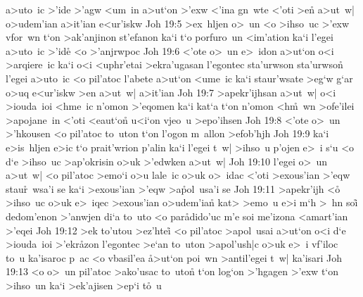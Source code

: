 a>uto~ic
>'ide
>'agw
<um~in
a>ut`on
>'exw
<'ina
gn~wte
<'oti
>en\r{}
a>ut~w|
o>udem'ian
a>it'ian
e<ur'iskw\bibvsend
\vs Joh 19:5
>ex~hljen
o>~un
<o
>ihso~uc
>'exw
vfor~wn
t`on
>ak'anjinon
st'efanon
ka`i
t`o
porfuro~un
<im'ation
ka`i
l'egei
a>uto~ic
>'id\r{e}
<o
>'anjrwpoc\bibvsend
\vs Joh 19:6
<'ote
o>~un
e>~idon
a>ut`on
o<i
>arqiere~ic
ka`i
o<i
<uphr'etai
>ekra'ugasan
l'egontec
sta'urwson
sta'urwso\r{n}
l'egei
a>uto~ic
<o
pil'atoc
l'abete
a>ut`on
<ume~ic
ka`i
staur'wsate
>eg`w
g`ar
o>uq
e<ur'iskw
>en
a>ut~w|
a>it'ian\bibvsend
\vs Joh 19:7
>apekr'ijhsan
a>ut~w|
o<i
>iouda~ioi
<hme~ic
n'omon
>'eqomen
ka`i
kat`a
t`on
n'omon
<h\r{m}~wn
>ofe'ilei
>apojane~in
<'oti
<eaut`on\r{}
u<i`on
vjeo~u
>epo'ihsen\bibvsend
\vs Joh 19:8
<'ote
o>~un
>'hkousen
<o
pil'atoc
to~uton
t`on
l'ogon
m~allon
>efob'hjh\bibvsend
\vs Joh 19:9
ka`i
e>is~hljen
e>ic
t`o
prait'wrion
p'alin
ka`i
l'egei
t~w|
>ihso~u
p'ojen
e>~i
s`u
<o
d`e
>ihso~uc
>ap'okrisin
o>uk
>'edwken
a>ut~w|\bibvsend
\vs Joh 19:10
l'egei
o>~un
a>ut~w|
<o
pil'atoc
>emo`i
o>u
lale~ic
o>uk
o>~idac
<'oti
>exous'ian
>'eqw
stau\r{r}~wsa'i
se
ka`i
>exous'ian
>'eqw
>a\r{p}ol~usa'i
se\bibvsend
\vs Joh 19:11
>apekr'ijh
<o\r{}
>ihso~uc
o>uk
e>~iqec
>exous'ian
o>udem'ian\r{}
kat>
>emo~u
e>i
m`h
>~hn
soi\r{}
dedom'enon
>'anwjen
di`a
to~uto
<o
par\r{a}dido'uc
m'e
soi
me'izona
<amart'ian
>'eqei\bibvsend
\vs Joh 19:12
>ek
to'utou
>ez'htei\r{}
<o
pil'atoc
>apol~usai
a>ut`on
o<i
d`e
>iouda~ioi
>'ekr\r{a}zon
l'egontec
>e`an
to~uton
>apol'ush|c
o>uk
e>~i
vf'iloc
to~u
ka'isaroc
p~ac
<o
vbasil'ea
\r{a}>ut`on
poi~wn
>antil'egei
t~w|
ka'isari\bibvsend
\vs Joh 19:13
<o
o>~un
pil'atoc
>ako'usac
to~uton\r{}
t`on
log`on
>'hgagen
>'exw
t`on
>ihso~un
ka`i
>ek'ajisen
>ep`i
t\r{o}~u
